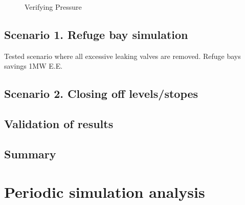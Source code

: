 	\begin{figure}[h]
		\centering
		\fbox{}
		\caption{Verifying Pressure}
		\label{fig: Verification Pressure kusasalethu Setpoint}
	\end{figure}
	
	\subsection{Scenario 1. Refuge bay simulation}
	Tested scenario where all excessive leaking valves are removed.
	Refuge bays savings 1MW E.E.
	
	\subsection{Scenario 2. Closing off levels/stopes}
	
	\subsection{Validation of results}
	\subsection{Summary}
\newpage
\section{Periodic simulation analysis}
